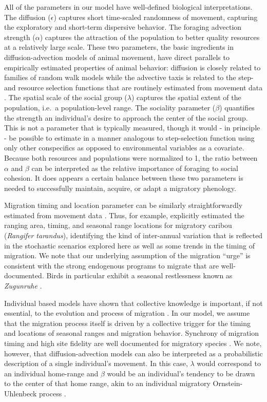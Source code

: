 \documentclass[utf8]{frontiersSCNS} %
\begin{document}
All of the parameters in our model have well-defined biological interpretations. The diffusion ($\epsilon$) captures short time-scaled randomness of movement, capturing the exploratory and short-term dispersive behavior. The foraging advection strength ($\alpha$) captures the attraction of the population to better quality resources at a relatively large scale. These two parameters, the basic ingredients in diffusion-advection models of animal movement, have direct parallels to empirically estimated properties of animal behavior: diffusion is closely related to families of random walk models \citep{Gurarie2011} while the advective taxis is related to the step- and resource selection functions that are routinely estimated from movement data \citep{Potts2020}. The spatial scale of the social group ($\lambda$) captures the spatial extent of the population, i.e.~a population-level range. The sociality parameter ($\beta$) quantifies the strength an individual's desire to approach the center of the social group. This is not a parameter that is typically measured, though it would - in principle - be possible to estimate in a manner analogous to step-selection function using only other conspecifics as opposed to environmental variables as a covariate. Because both resources and populations were normalized to 1, the ratio between $\alpha$ and $\beta$ can be interpreted as the relative importance of foraging to social cohesion. It does appears a certain balance between these two parameters is needed to successfully maintain, acquire, or adapt a migratory phenology. 

Migration timing and location parameter can be similarly straightforwardly estimated from movement data \citep{Cagnacci2015, Gurarie2019}. Thus, for example, \citet{Gurarie2019} explicitly estimated the ranging area, timing, and seasonal range locations for migratory caribou (\emph{Rangifer tarandus}), identifying the kind of inter-annual variation that is reflected in the stochastic scenarios explored here as well as some trends in the timing of migration. We note that our underlying assumption of the migration ``urge'' is consistent with the strong endogenous programs to migrate that are well-documented. Birds in particular exhibit a seasonal restlessness known as \emph{Zugunruhe} \citep{Berthold1999, Helm2006}.

Individual based models have shown that collective knowledge is important, if not essential, to the evolution and process of migration \citep{Shaw2013, Guttal2010, Berdahl2018}. In our model, we assume that the migration process itself is driven by a collective trigger for the timing and locations of seasonal ranges and migration behavior. Synchrony of migration timing and high site fidelity are well documented for migratory species \citep{Gurarie2019, Joly2021}. We note, however, that diffusion-advection models can also be interpreted as a probabilistic description of a single individual's movement. In this case, $\lambda$ would correspond to an individual home-range and $\beta$ would be an individual's tendency to be drawn to the center of that home range, akin to an individual migratory Ornstein-Uhlenbeck process \citep{Gurarie2017}.
\end{document}
